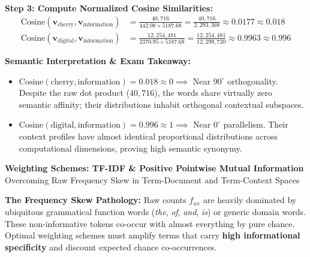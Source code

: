 \documentclass[10pt,a4paper]{article}
\begin{document}
\begin{examplebox}
\textbf{Step 3: Compute Normalized Cosine Similarities:}
\begin{align*}
    \text{Cosine}(\mathbf{v}_{\text{cherry}}, \mathbf{v}_{\text{information}}) &= \frac{40{,}716}{442.08 \times 5187.68} = \frac{40{,}716}{2{,}293{,}368} \approx \mathbf{0.0177} \approx \mathbf{0.018} \\
    \text{Cosine}(\mathbf{v}_{\text{digital}}, \mathbf{v}_{\text{information}}) &= \frac{12{,}254{,}481}{2370.95 \times 5187.68} = \frac{12{,}254{,}481}{12{,}299{,}720} \approx \mathbf{0.9963} \approx \mathbf{0.996}
\end{align*}

\textbf{Semantic Interpretation \& Exam Takeaway:}
\begin{itemize}[leftmargin=10pt,topsep=1pt,itemsep=0.5pt]
    \item $\text{Cosine}(\text{cherry}, \text{information}) = 0.018 \approx 0 \implies$ Near $90^\circ$ orthogonality. Despite the raw dot product ($40{,}716$), the words share virtually zero semantic affinity; their distributions inhabit orthogonal contextual subspaces.
    \item $\text{Cosine}(\text{digital}, \text{information}) = 0.996 \approx 1 \implies$ Near $0^\circ$ parallelism. Their context profiles have almost identical proportional distributions across computational dimensions, proving high semantic synonymy.
\end{itemize}
\end{examplebox}

\clearpage

\begin{center}
    \vspace{-4pt}
    {\Large\bfseries\color{themeblue} Weighting Schemes: TF-IDF \& Positive Pointwise Mutual Information}\\[1pt]
    {\small\color{darkgray} Overcoming Raw Frequency Skew in Term-Document and Term-Context Spaces}
    \vspace{-4pt}
\end{center}

\begin{overviewbox}
\footnotesize
\textbf{The Frequency Skew Pathology:} Raw counts $f_{wc}$ are heavily dominated by ubiquitous grammatical function words (\textit{the}, \textit{of}, \textit{and}, \textit{is}) or generic domain words. These non-informative tokens co-occur with almost everything by pure chance. Optimal weighting schemes must amplify terms that carry \textbf{high informational specificity} and discount expected chance co-occurrences.
\end{overviewbox}
\end{document}
